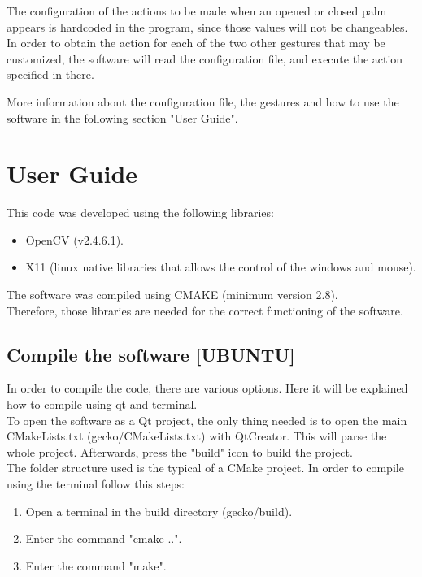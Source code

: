 \documentclass{article}
\begin{document}
\begin{center}
\end{center}

The configuration of the actions to be made when an opened or closed palm appears is hardcoded in the program, since those values will not be changeables. In order to obtain the action for each of the two other gestures that may be customized, the software will read the configuration file, and execute the action specified in there. 

More information about the configuration file, the gestures and how to use the software in the following section "User Guide". 

\section{User Guide}
This code was developed using the following libraries: 
\begin{itemize}
\item OpenCV (v2.4.6.1).
\item X11 (linux native libraries that allows the control of the windows and mouse). 
\end{itemize}
The software was compiled using CMAKE (minimum version 2.8).
\\[0.5cm]
Therefore, those libraries are needed for the correct functioning of the software. 


\subsection{Compile the software [UBUNTU]}

In order to compile the code, there are various options. Here it will be explained how to compile using qt and terminal. 
\\
To open the software as a Qt project, the only thing needed is to open the main CMakeLists.txt (gecko/CMakeLists.txt) with QtCreator. This will parse the whole project. 
Afterwards, press the "build" icon to build the project. 
\\[0.5cm]
The folder structure used is the typical of a CMake project. In order to compile using the terminal follow this steps: 
\begin{enumerate}
 \item Open a terminal in the build directory (gecko/build). 
 \item Enter the command "cmake ..". 
 \item Enter the command "make". 
\end{enumerate}
\end{document}
